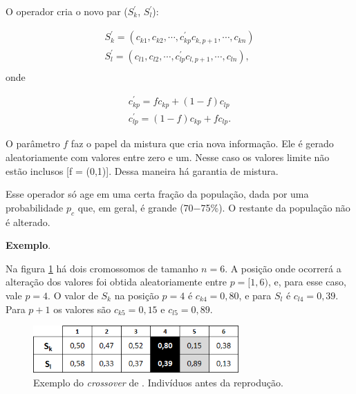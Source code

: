 	O operador cria o novo par ($S^{'}_k$, $S^{'}_l$):
	
	\begin{equation}
		\begin{array}{l}
			S^{'}_k = (c_{k1}, c_{k2}, \cdots, c^{'}_{kp} c_{k,p+1}, \cdots, c_{kn})	\\
			S^{'}_l = (c_{l1}, c_{l2}, \cdots,  c^{'}_{lp} c_{l,p+1}, \cdots, c_{ln}),	\\
			
		\end{array}
	\end{equation}
	onde
	
	\begin{equation}
		\begin{array}{l}
			c^{'}_{kp} = f c_{kp} + (1 - f) c_{lp}     \\
			c^{'}_{lp} = (1 - f) c_{kp} + f c_{lp}.
		\end{array}
	\end{equation}
	
	O parâmetro $f$ faz o papel da mistura que cria nova informação. Ele é gerado aleatoriamente com valores entre zero e um. Nesse caso os valores limite não estão inclusos [f = (0,1)]. Dessa maneira há garantia de mistura.
	
	Esse operador só age em uma certa fração da população, dada por uma probabilidade $p_c$ que, em geral, é grande (70$-$75\%). O restante da população não é alterado.

\textbf{Exemplo}.

Na figura \ref{fig:cross2004_tabelaAntes} há dois cromossomos de tamanho $n = 6$. A posição onde ocorrerá a alteração dos valores foi obtida aleatoriamente entre $p = [1,6)$, e, para esse caso, vale $p = 4$. O valor de $S_k$ na posição $p = 4$ é $c_{k4} = 0,80$, e para $S_l$ é $c_{l4} = 0,39$. Para $p + 1$ os valores são $c_{k5} = 0,15$ e $c_{l5} = 0,89$.

\begin{figure}[htbp]
	\centering
		\includegraphics[width=0.70\textwidth]{figs/materiais_metodo/autovalores_com_ga/cross2004_tabelaAntes.png}
	\caption{Exemplo do \emph{crossover} de \cite{metodo2004}. Indivíduos antes da reprodução.}
	\label{fig:cross2004_tabelaAntes}
\end{figure}

